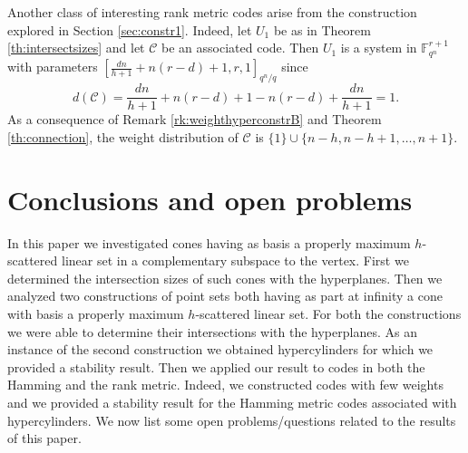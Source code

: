 \documentclass[11pt]{amsart}
\newcommand{\fqn}{\mathbb{F}_{q^n}}
\begin{document}
Another class of interesting rank metric codes arise from the construction explored in Section \ref{sec:constr1}.
Indeed, let $U_1$ be as in Theorem \ref{th:intersectsizes} and let $\mathcal{C}$ be an associated code. Then $U_1$ is a system in $\fqn^{r+1}$ with parameters $\left[  \frac{dn}{h+1}+n(r-d)+1,r,1 \right]_{q^n/q}$ since
\[ d(\mathcal{C})= \frac{dn}{h+1}+n(r-d)+1 -n(r-d)+\frac{dn}{h+1}=1. \]
As a consequence of Remark \ref{rk:weighthyperconstrB} and Theorem \ref{th:connection}, the weight distribution of $\mathcal{C}$ is
 $\{ 1 \} \cup \{ n-h, n-h+1, \dots, n+1 \}$.

\section{Conclusions and open problems}\label{sec:final}

In this paper we investigated cones having as basis a properly maximum $h$-scattered linear set in a complementary subspace to the vertex. First we determined the intersection sizes of such cones with the hyperplanes. Then we analyzed two constructions of point sets both having as part at infinity a cone with basis a properly maximum $h$-scattered linear set. For both the constructions we were able to determine their intersections with the hyperplanes. 
As an instance of the second construction we obtained hypercylinders for which we provided a stability result.
Then we applied our result to codes in both the Hamming and the rank metric. Indeed, we constructed codes with few weights and we provided a stability result for the Hamming metric codes associated with hypercylinders.
We now list some open problems/questions related to the results of this paper.
\end{document}
